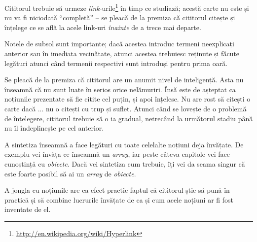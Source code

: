 
Cititorul trebuie să urmeze
\textsl{link}-urile\footnote{\url{http://en.wikipedia.org/wiki/Hyperlink}}
în timp ce
studiază; acestă carte nu este și nu va fi niciodată ``completă'' -- se pleacă
de la premiza că cititorul citește și înțelege ce se află la acele link-uri
\textit{înainte} de a trece mai departe.

Notele de subsol sunt importante; dacă acestea introduc termeni neexplicați
anterior sau în imediata vecinătate, atunci acestea trebuiesc reținute și
făcute legături atunci când termenii respectivi sunt introduși pentru prima
oară.

Se pleacă de la premiza că cititorul are un anumit nivel de inteligență. Asta
nu înseamnă că nu sunt luate în serios orice nelămuriri. Însă este de așteptat
ca noțiunile prezentate să fie citite cel puțin, și apoi înțelese. Nu are rost
să citești o carte dacă ... nu o citești cu trup și suflet. Atunci când se
lovește de o problemă de înțelegere, cititorul trebuie să o ia gradual,
netrecând la următorul stadiu până nu îl îndeplinește pe cel anterior.



A sintetiza înseamnă a face legături cu toate celelalte noțiuni deja învățate.
De exemplu vei învăța ce înseamnă un \textit{array}, iar peste câteva capitole
vei face cunoștință cu \textit{obiecte}. Dacă vei sintetiza cum trebuie, îți vei
da seama singur că este foarte posibil să ai un \textit{array} de
\textit{obiecte}.

A jongla cu noțiunile are ca efect practic faptul că cititorul știe să pună în
practică și să combine lucrurile învățate de ca și cum acele noțiuni ar fi fost
inventate de el.


